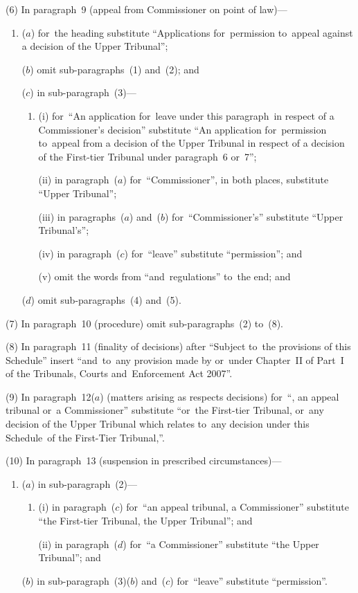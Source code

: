 \documentclass[12pt,a4paper]{article}
\begin{document}
(6) In paragraph~9 (appeal from Commissioner on point of law)—
\begin{enumerate}\item[]
($a$) for~the heading substitute “Applications for~permission to~appeal against a decision of the Upper Tribunal”;

($b$) omit sub-paragraphs~(1) and~(2); and

($c$) in sub-paragraph~(3)—
\begin{enumerate}\item[]
(i) for~“An application for~leave under this paragraph~in respect of a Commissioner’s decision” substitute “An application for~permission to~appeal from a decision of the Upper Tribunal in respect of a decision of the First-tier Tribunal under paragraph~6 or~7”;

(ii) in paragraph~($a$)  for~“Commissioner”, in both places, substitute “Upper Tribunal”;

(iii) in paragraphs~($a$)  and~($b$)  for~“Commissioner’s” substitute “Upper Tribunal’s”;

(iv)  in paragraph~($c$)  for~“leave” substitute “permission”; and

(v)  omit the words from “and~regulations” to~the end; and
\end{enumerate}

($d$) omit sub-paragraphs~(4) and~(5).
\end{enumerate}

(7) In paragraph~10 (procedure) omit sub-paragraphs~(2) to~(8).

(8) In paragraph~11 (finality of decisions) after “Subject to~the provisions of this Schedule” insert “and~to~any provision made by or~under Chapter~II of Part~I of the Tribunals, Courts and~Enforcement Act 2007”.

(9) In paragraph~12($a$)  (matters arising as respects decisions) for~“, an appeal tribunal or~a Commissioner” substitute “or~the First-tier Tribunal, or~any decision of the Upper Tribunal which relates to~any decision under this Schedule~of the First-Tier Tribunal,”.

(10) In paragraph~13 (suspension in prescribed circumstances)—
\begin{enumerate}\item[]
($a$) in sub-paragraph~(2)—
\begin{enumerate}\item[]
(i) in paragraph~($c$)  for~“an appeal tribunal, a Commissioner” substitute “the First-tier Tribunal, the Upper Tribunal”; and

(ii) in paragraph~($d$)  for~“a Commissioner” substitute “the Upper Tribunal”; and
\end{enumerate}

($b$) in sub-paragraph~(3)($b$)  and~($c$)  for~“leave” substitute “permission”.
\end{enumerate}
\end{document}
